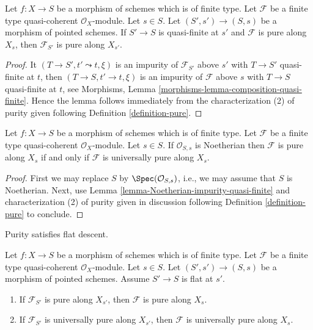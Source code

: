 \begin{lemma}
\label{lemma-quasi-finite-base-change}
Let $f : X \to S$ be a morphism of schemes which is of finite type.
Let $\mathcal{F}$ be a finite type quasi-coherent $\mathcal{O}_X$-module.
Let $s \in S$. Let $(S', s') \to (S, s)$ be a morphism of pointed schemes.
If $S' \to S$ is quasi-finite at $s'$ and $\mathcal{F}$ is pure along $X_s$,
then $\mathcal{F}_{S'}$ is pure along $X_{s'}$.
\end{lemma}

\begin{proof}
It $(T \to S', t' \leadsto t, \xi)$ is an impurity of
$\mathcal{F}_{S'}$ above $s'$ with $T \to S'$ quasi-finite at $t$,
then $(T \to S, t' \to t, \xi)$ is an impurity of $\mathcal{F}$
above $s$ with $T \to S$ quasi-finite at $t$, see
Morphisms, Lemma \ref{morphisms-lemma-composition-quasi-finite}.
Hence the lemma follows immediately from the characterization (2)
of purity given following
Definition \ref{definition-pure}.
\end{proof}

\begin{lemma}
\label{lemma-Noetherian-base-change}
Let $f : X \to S$ be a morphism of schemes which is of finite type.
Let $\mathcal{F}$ be a finite type quasi-coherent $\mathcal{O}_X$-module.
Let $s \in S$. If $\mathcal{O}_{S, s}$ is Noetherian then
$\mathcal{F}$ is pure along $X_s$ if and only if $\mathcal{F}$
is universally pure along $X_s$.
\end{lemma}

\begin{proof}
First we may replace $S$ by $\Spec(\mathcal{O}_{S, s})$, i.e.,
we may assume that $S$ is Noetherian. Next, use
Lemma \ref{lemma-Noetherian-impurity-quasi-finite}
and characterization (2) of purity given in discussion following
Definition \ref{definition-pure}
to conclude.
\end{proof}

\noindent
Purity satisfies flat descent.

\begin{lemma}
\label{lemma-flat-descend-pure}
Let $f : X \to S$ be a morphism of schemes which is of finite type.
Let $\mathcal{F}$ be a finite type quasi-coherent $\mathcal{O}_X$-module.
Let $s \in S$. Let $(S', s') \to (S, s)$ be a morphism of pointed schemes.
Assume $S' \to S$ is flat at $s'$.
\begin{enumerate}
\item If $\mathcal{F}_{S'}$ is pure along $X_{s'}$,
then $\mathcal{F}$ is pure along $X_s$.
\item If $\mathcal{F}_{S'}$ is universally pure along $X_{s'}$,
then $\mathcal{F}$ is universally pure along $X_s$.
\end{enumerate}
\end{lemma}

